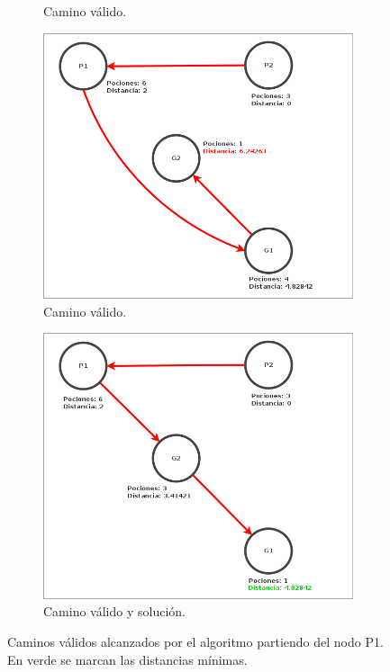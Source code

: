 \begin{figure}[H]
\begin{subfigure}[b]{0.49\textwidth}
        \caption{Camino válido.}
        \label{fig: ejercicio1_ejemplo_camino2_2}
    \end{subfigure}
    \begin{subfigure}[b]{0.49\textwidth}
        \includegraphics[width=\linewidth]{img/ejercicio1/ejercicio1_ejemplo_camino2_3.png}
        \caption{Camino válido.}
        \label{fig: ejercicio1_ejemplo_camino2_3}
    \end{subfigure}
    \begin{subfigure}[b]{0.49\textwidth}
        \includegraphics[width=\linewidth]{img/ejercicio1/ejercicio1_ejemplo_camino2_4.png}
        \caption{Camino válido y solución.}
        \label{fig: ejercicio1_ejemplo_camino2_4}
    \end{subfigure}
    \caption{Caminos válidos alcanzados por el algoritmo partiendo del nodo P1. En verde se marcan las distancias mínimas.}
    \label{fig: ejercicio1_ejemplo_caminos2}
\end{figure}


